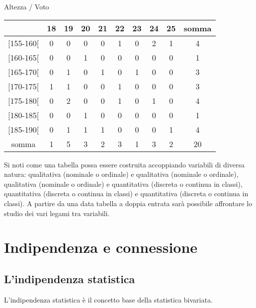 \begin{center}
\vspace{1em}
Altezza / Voto\\ 
\begin{tabular}{ccccccccc|c}
        \hline
            &  18 &  19 &  20 &  21 &  22 &  23 &  24 &  25 & somma\\ 
\hline
{[155-160[} &   0 &   0 &   0 &   0 &   1 &   0 &   2 &   1 &     4\\
{[160-165[} &   0 &   0 &   1 &   0 &   0 &   0 &   0 &   0 &     1\\
{[165-170[} &   0 &   1 &   0 &   1 &   0 &   1 &   0 &   0 &     3\\
{[170-175[} &   1 &   1 &   0 &   0 &   1 &   0 &   0 &   0 &     3\\
{[175-180[} &   0 &   2 &   0 &   0 &   1 &   0 &   1 &   0 &     4\\
{[180-185[} &   0 &   0 &   1 &   0 &   0 &   0 &   0 &   0 &     1\\
{[185-190[} &   0 &   1 &   1 &   1 &   0 &   0 &   0 &   1 &     4\\
\hline
somma       &   1 &   5 &   3 &   2 &   3 &   1 &   3 &   2 &    20\\
\end{tabular}
\end{center}

\vspace{6pt}
Si noti come una tabella possa essere costruita accoppiando variabili di 
diversa natura: qualitativa (nominale o ordinale) e qualitativa (nominale o 
ordinale), qualitativa (nominale o ordinale) e quantitativa (discreta o 
continua in classi), quantitativa (discreta o continua in classi) e 
quantitativa (discreta o continua in classi). A partire da una data tabella 
a doppia entrata sarà possibile affrontare lo studio dei vari legami tra 
variabili.

\section{Indipendenza e connessione}
\label{sec:stat02_indipendenza_connessione}

\subsection{L'indipendenza statistica}
\label{subsec:stat02_indipendenza}

L'indipendenza statistica è il concetto base della statistica bivariata.

